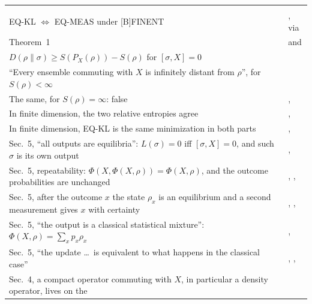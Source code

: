 \documentclass[11pt]{article}
\begin{document}
\begin{xltabular}{\textwidth}{@{}BL@{}}
   \\
EQ-KL $\Leftrightarrow$ EQ-MEAS under [B]FINENT & , via
   \\
Theorem~1 &  and  \\
$D(\rho\|\sigma) \ge S(P_X(\rho)) - S(\rho)$ for $[\sigma, X] = 0$ &
   \\
``Every ensemble commuting with $X$ is infinitely distant from $\rho$'', for $S(\rho) < \infty$ &
   \\
The same, for $S(\rho) = \infty$: false & ,
   \\
In finite dimension, the two relative entropies agree & ,
   \\
In finite dimension, EQ-KL is the same minimization in both parts &
  ,  \\
Sec.~5, ``all outputs are equilibria'': $L(\sigma) = 0$ iff $[\sigma, X] = 0$, and such $\sigma$ is
  its own output & ,  \\
Sec.~5, repeatability: $\Phi(X, \Phi(X, \rho)) = \Phi(X, \rho)$, and the outcome probabilities
  are unchanged & , ,
   \\
Sec.~5, after the outcome $x$ the state $\rho_x$ is an equilibrium and a second measurement gives
  $x$ with certainty & ,
  ,  \\
Sec.~5, ``the output is a classical statistical mixture'': $\Phi(X, \rho) = \sum_x p_x\rho_x$ &
  ,  \\
Sec.~5, ``the update \dots\ is equivalent to what happens in the classical case'' &
  , ,
   \\
Sec.~4, a compact operator commuting with $X$, in particular a density operator, lives on the

\end{xltabular}
\end{document}
